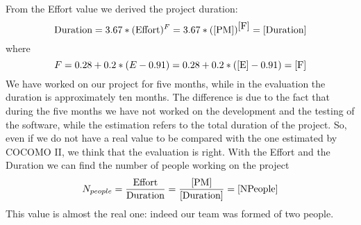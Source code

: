From the Effort value we derived the project duration:
\begin{equation}
    \textrm{Duration} = 3.67 * (\textrm{Effort})^{F} = 3.67 * (\ref{PM})^{\ref{F}} = \manuallabel{Duration}{10.42}\ref{Duration}
\end{equation}
where
\begin{equation}
    F = 0.28 + 0.2 * (E - 0.91) = 0.28 + 0.2 * (\ref{E} - 0.91) = \manuallabel{F}{0.3112}\ref{F}
\end{equation}
\newline
We have worked on our project for five months, while in the evaluation the duration is approximately ten months. The difference is due to the fact that during the five months we have not worked on the development and the testing of the software, while the estimation refers to the total duration of the project.
\newline
So, even if we do not have a real value to be compared with the one estimated by COCOMO II, we think that the evaluation is right.
\newline
With the Effort and the Duration we can find the number of people working on the project
\begin{equation}
    N_{people} = \frac{\textrm{Effort}}{\textrm{Duration}} = \frac{\ref{PM}}{\ref{Duration}} = \manuallabel{NPeople}{2.74}\ref{NPeople}
\end{equation}
\newline
This value is almost the real one: indeed our team was formed of two people.